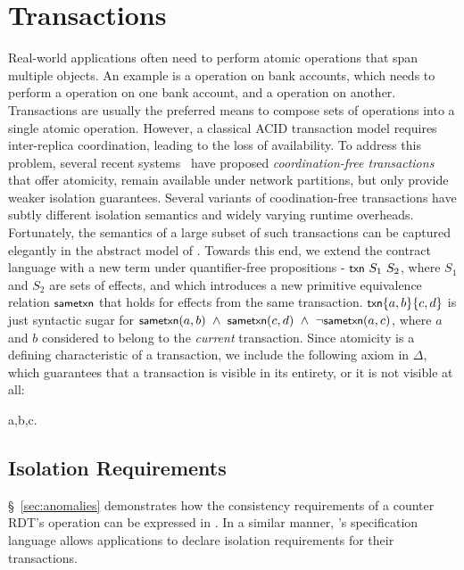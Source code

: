 \section{Transactions}
\label{sec:transactions}

Real-world applications often need to perform atomic operations that
span multiple objects. An example is a  operation on bank
accounts, which needs to perform a  operation on one bank
account, and a  operation on another. Transactions are
usually the preferred means to compose sets of operations into a
single atomic operation. However, a classical ACID transaction model
requires inter-replica coordination, leading to the loss of
availability. To address this problem, several recent
systems~\cite{Walter,Burckhardt2012,BailisHAT} have proposed
\emph{coordination-free transactions} that offer atomicity, remain
available under network partitions, but only provide weaker isolation
guarantees. Several variants of coodination-free transactions have
subtly different isolation semantics and widely varying runtime
overheads.  Fortunately, the semantics of a large subset of such
transactions can be captured elegantly in the abstract model of \name.
Towards this end, we extend the contract language with a new term
under quantifier-free propositions - ${\small {\normalfont \textsf{txn}}}~S_1~S_2$, where
$S_1$ and $S_2$ are sets of effects, and which introduces a new primitive
equivalence relation $\small {\normalfont \textsf{sametxn}}$ that holds for effects from
the same transaction. $\small {\normalfont \textsf{txn}}\{a,b\}\{c,d\}$ is just syntactic sugar
for $\small {\normalfont \textsf{sametxn}(a,b)} ~\wedge~ {\normalfont \textsf{sametxn}(c,d)} ~\wedge~
\neg{\normalfont \textsf{sametxn}(a,c)}$, where $a$ and $b$ considered to belong to the
\emph{current} transaction. Since atomicity is a defining
characteristic of a transaction, we include the following axiom in
$\Delta$, which guarantees that a transaction is visible in its
entirety, or it is not visible at all:

\begin{cmathpar}
\forall a,b,c.~ ~\wedge~  ~\wedge~ 
\Rightarrow {}
\end{cmathpar}

\subsection{Isolation Requirements}

\S~\ref{sec:anomalies} demonstrates how the consistency requirements of
a counter RDT's  operation can be expressed in \name. In a
similar manner, \name's specification language allows applications to
declare isolation requirements for their transactions.

